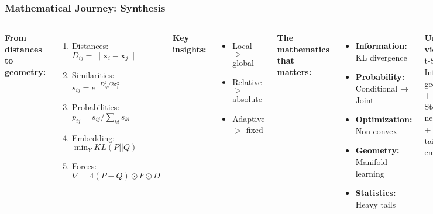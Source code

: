 \documentclass[aspectratio=169]{beamer}
\begin{document}
\begin{frame}
\frametitle{Mathematical Journey: Synthesis}
\begin{columns}[T]
\textbf{From distances to geometry:}
\begin{enumerate}
\small
\item Distances: $D_{ij} = \|\mathbf{x}_i - \mathbf{x}_j\|$
\item Similarities: $s_{ij} = e^{-D_{ij}^2/2\sigma_i^2}$
\item Probabilities: $p_{ij} = s_{ij}/\sum_{kl} s_{kl}$
\item Embedding: $\min_Y KL(P||Q)$
\item Forces: $\nabla = 4(P-Q) \odot F \odot D$
\end{enumerate}

\vspace{0.3cm}
\textbf{Key insights:}
\begin{itemize}
\small
\item Local $>$ global
\item Relative $>$ absolute
\item Adaptive $>$ fixed
\end{itemize}

\textbf{The mathematics that matters:}
\begin{itemize}
\small
\item \textbf{Information:} KL divergence
\item \textbf{Probability:} Conditional → Joint
\item \textbf{Optimization:} Non-convex
\item \textbf{Geometry:} Manifold learning
\item \textbf{Statistics:} Heavy tails
\end{itemize}

\vspace{0.3cm}
\textbf{Unified view:}\\
\small t-SNE = Information geometry\\
+ Stochastic neighbors\\
+ Heavy-tailed embeddings
\end{columns}
\end{frame}
\end{document}
